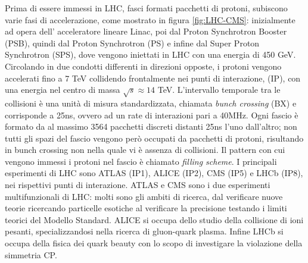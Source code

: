 Prima di essere immessi in LHC, fasci formati pacchetti di protoni, subiscono varie fasi di accelerazione, come mostrato in figura \ref{fig:LHC-CMS}: inizialmente ad opera dell' acceleratore lineare Linac, poi dal Proton Synchrotron Booster (PSB), quindi dal Proton Synchrotron (PS) e infine dal Super Proton Synchrotron (SPS), dove vengono iniettati in LHC con una energia di 450 GeV. Circolando in due condotti differenti in direzioni opposte, i protoni vengono accelerati fino a 7 TeV collidendo frontalmente nei punti di interazione, (IP), con una energia nel centro di massa $\sqrt{s} \approx 14$ TeV. L'intervallo temporale tra le collisioni è una unità di misura standardizzata, chiamata \textit{bunch crossing} (BX) e corrisponde a 25ns, ovvero ad un rate di interazioni pari a 40MHz. Ogni fascio è formato da al massimo 3564 pacchetti discreti distanti 25ns l'uno dall'altro; non tutti gli spazi del fascio vengono però occupati da pacchetti di protoni, risultando in bunch crossing non nella quale vi è assenza di collisioni. Il pattern con cui vengono immessi i protoni nel fascio è chiamato \textit{filling scheme}. \newline
I principali esperimenti di LHC sono ATLAS (IP1), ALICE (IP2), CMS (IP5) e LHCb (IP8), nei rispettivi punti di interazione. \newline
ATLAS e CMS sono i due esperimenti multifunzionali di LHC: molti sono gli ambiti di ricerca, dal verificare nuove teorie ricercando particelle esotiche al verificare la precisione testando i limiti teorici del Modello Standard. ALICE si occupa dello studio della collisione di ioni pesanti, specializzandosi nella ricerca di gluon-quark plasma. Infine LHCb
si occupa della fisica dei quark beauty con lo scopo di investigare la violazione della simmetria CP.

